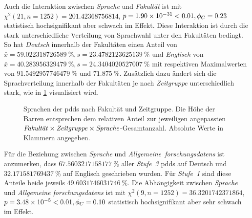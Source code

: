 Auch die Interaktion zwischen \textit{Sprache} und \textit{Fakultät} ist mit $\chi^2 (\num{21}, n=\num{1252}) = \num[round-mode=places,round-precision=2]{201.42368756814}$, $p = \num[round-mode=places,round-precision=2]{1.90053471088499E-31}<\num{0.01},\phi_C=\num[round-mode=places,round-precision=2]{0.231575430181447}$ statistisch hochsignifikant aber schwach im Effekt.
Diese Interaktion ist durch die stark unterschiedliche Verteilung von Sprachwahl unter den Fakultäten bedingt.
So hat \textit{Deutsch} innerhalb der Fakultäten einen Anteil von $\bar{x}=\SI[round-mode=places,round-precision=2]{59.022318726589}{\percent},s=\SI[round-mode=places,round-precision=2]{23.4782123625139}{\percent}$ und \textit{Englisch} von $\bar{x}=\SI[round-mode=places,round-precision=2]{40.283956329479}{\percent},s=\SI[round-mode=places,round-precision=2]{24.3404020527007}{\percent}$ mit respektiven Maximalwerten von $\SI[round-mode=places,round-precision=2]{91.5492957746479}{\percent}$ und $\SI[round-mode=places,round-precision=2]{71.875}{\percent}$.
Zusätzlich dazu ändert sich die Sprachverteilung innerhalb der Fakultäten je nach \textit{Zeitgruppe} unterschiedlich stark, wie in \cref{fig:luh-repo_sprache_x_fakultät_x_zeitgruppe} visualisiert wird.
\begin{figure}[!htbp]
    \resizebox{\ifdim\width>\textwidth\textwidth\else\width\fi}{!}{}
    \caption{Sprachen der \glspl{pdd} nach Fakultät und Zeitgruppe.
    Die Höhe der Barren entsprechen dem relativen Anteil zur jeweiligen angepassten $\text{\textit{Fakultät}}\times\text{\textit{Zeitgruppe}}\times\text{\textit{Sprache}}$-Gesamtanzahl.
    Absolute Werte in Klammern angegeben.}
    \label{fig:luh-repo_sprache_x_fakultät_x_zeitgruppe}
\end{figure}

Für die Beziehung zwischen \textit{Sprache} und \textit{Allgemeine~\glspl{forschungsdaten}} ist anzumerken, dass $\SI[round-mode=places,round-precision=2]{67.5603217158177}{\percent}$ aller \textit{Stufe~3} \glspl{pdd} auf Deutsch und $\SI[round-mode=places,round-precision=2]{32.171581769437}{\percent}$ auf Englisch geschrieben wurden.
Für \textit{Stufe~1} sind diese Anteile beide jeweils $\SI[round-mode=places,round-precision=2]{49.6031746031746}{\percent}$.
Die Abhängigkeit zwischen \textit{Sprache} und \textit{Allgemeine \glspl{forschungsdaten}} ist mit $\chi^2 (\num{9}, n=\num{1252}) = \num[round-mode=places,round-precision=2]{36.3201742371864}$, $p = \num[round-mode=places,round-precision=2]{3.47809061239522E-05}<\num{0.01},\phi_C=\num[round-mode=places,round-precision=2]{0.0983356900818459}$ statistisch hochsignifikant aber sehr schwach im Effekt.

